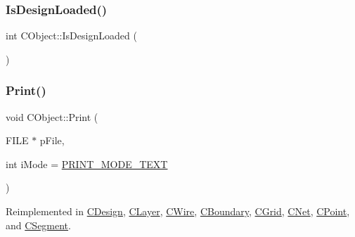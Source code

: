 \mbox{\label{classCObject_af7d0080ca4135e9bbe9e92abfe9f904a}} 
\subsubsection{\texorpdfstring{IsDesignLoaded()}{IsDesignLoaded()}}
{\footnotesize\ttfamily int C\+Object\+::\+Is\+Design\+Loaded (\begin{DoxyParamCaption}{ }\end{DoxyParamCaption})\hspace{0.3cm}{\ttfamily [static]}}

\mbox{\label{classCObject_a75afd905b2d14ed374c75d90f079a389}} 
\subsubsection{\texorpdfstring{Print()}{Print()}}
{\footnotesize\ttfamily void C\+Object\+::\+Print (\begin{DoxyParamCaption}\item[{F\+I\+LE $\ast$}]{p\+File,  }\item[{int}]{i\+Mode = {\ttfamily \mbox{\hyperlink{BoxRouter_8h_a57a837ae96ef88ba334045a535dd3b8e}{P\+R\+I\+N\+T\+\_\+\+M\+O\+D\+E\+\_\+\+T\+E\+XT}}} }\end{DoxyParamCaption})\hspace{0.3cm}{\ttfamily [virtual]}}



Reimplemented in \mbox{\hyperlink{classCDesign_ae6f1b5262fb9420660bd768cb7ae613e}{C\+Design}}, \mbox{\hyperlink{classCLayer_a5bba2c50c546b8e5301370f08e963ee6}{C\+Layer}}, \mbox{\hyperlink{classCWire_a76b2e23a425ddd51f02f41ba2caf3134}{C\+Wire}}, \mbox{\hyperlink{classCBoundary_a12a1e37297bd35f915544d02bd8c0cf1}{C\+Boundary}}, \mbox{\hyperlink{classCGrid_a6462a8c5f7d7b6cbba02bac1d82dcbba}{C\+Grid}}, \mbox{\hyperlink{classCNet_a94a51f1ccadf689a3bcfa167f37e12f5}{C\+Net}}, \mbox{\hyperlink{classCPoint_a1610463f19b7ff508ed229791dd6335d}{C\+Point}}, and \mbox{\hyperlink{classCSegment_af1e339a0f89697ab0d851858aab13b89}{C\+Segment}}.

\mbox{\label{classCObject_a6946fc7b7c10ee357b77dad0466650d2}} 
